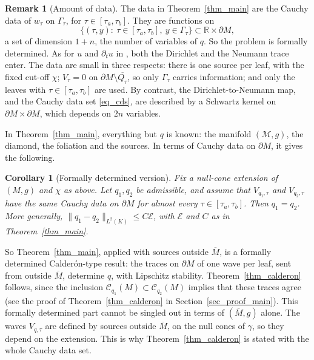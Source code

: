 \documentclass[12pt,reqno]{amsart}
\numberwithin{equation}{section}
\theoremstyle{definition}
\theoremstyle{plain}
\newtheorem{corollary}[theorem]{Corollary}
\theoremstyle{definition}
\theoremstyle{definition}
\newtheorem{remark}[theorem]{Remark}
\newcommand{\R}{\mathbb{R}}
\newcommand{\M}{\mathcal{M}}
\newcommand{\uu}{M}
\def\R{\mathbb R}
\begin{document}
\begin{remark}[Amount of data]\label{rem_data_count}
The data in Theorem~\ref{thm_main} are the Cauchy data of $w_\tau$ on $\Gamma_\tau$, for $\tau\in[\tau_a,\tau_b]$. They are functions on
\[
\{(\tau,y):\ \tau\in[\tau_a,\tau_b],\ y\in\Gamma_\tau\}\subset\R\times\partial\uu,
\]
a set of dimension $1+n$, the number of variables of $q$. So the problem is formally determined. As for $u$ and $\partial_tu$ in \cite{doi:10.1137/21M1400596,krishnan2023point}, both the Dirichlet and the Neumann trace enter. The data are small in three respects: there is one source per leaf, with the fixed cut-off $\chi$; $V_\tau=0$ on $\partial\uu\setminus\overline{Q_\tau}$, so only $\Gamma_\tau$ carries information; and only the leaves with $\tau\in[\tau_a,\tau_b]$ are used. By contrast, the Dirichlet-to-Neumann map, and the Cauchy data set \eqref{eq_cds}, are described by a Schwartz kernel on $\partial\uu\times\partial\uu$, which depends on $2n$ variables.
\end{remark}

In Theorem~\ref{thm_main}, everything but $q$ is known: the manifold $(\M,g)$, the diamond, the foliation and the sources. In terms of Cauchy data on $\partial\uu$, it gives the following.

\begin{corollary}[Formally determined version]\label{cor_fd_calderon}
Fix a null-cone extension of $(\uu,g)$ and $\chi$ as above. Let $q_1,q_2$ be admissible, and assume that $V_{q_1,\tau}$ and $V_{q_2,\tau}$ have the same Cauchy data on $\partial\uu$ for almost every $\tau\in[\tau_a,\tau_b]$. Then $q_1=q_2$. More generally, $\|q_1-q_2\|_{L^2(K)}\le C\mathcal E$, with $\mathcal E$ and $C$ as in Theorem~\ref{thm_main}.
\end{corollary}



So Theorem~\ref{thm_main}, applied with sources outside $\overline\uu$, is a formally determined Calder\'on-type result: the traces on $\partial\uu$ of one wave per leaf, sent from outside $\overline\uu$, determine $q$, with Lipschitz stability. Theorem~\ref{thm_calderon} follows, since the inclusion $\mathcal C_{q_1}(\uu)\subset\mathcal C_{q_2}(\uu)$ implies that these traces agree (see the proof of Theorem~\ref{thm_calderon} in Section~\ref{sec_proof_main}). This formally determined part cannot be singled out in terms of $(\overline\uu,g)$ alone. The waves $V_{q,\tau}$ are defined by sources outside $\overline\uu$, on the null cones of $\gamma$, so they depend on the extension. This is why Theorem~\ref{thm_calderon} is stated with the whole Cauchy data set.
\end{document}
